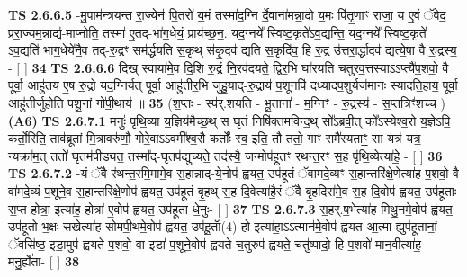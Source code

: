 \documentclass[17pt]{extarticle}
\begin{document}
                                \textbf{ TS 2.6.6.5} \newline
                  -मु॒पाम॑न्त्रयन्त रा॒ज्येन॑ पि॒तरो॑ य॒मं तस्मा॑द॒ग्नि र्दे॒वाना॑मन्ना॒दो य॒मः पि॑तृ॒णाꣳ राजा॒ य ए॒वं ॅवेद॒ प्ररा॒ज्यम॒न्नाद्य॑-माप्नोति॒ तस्मा॑ ए॒तद्-भा॑ग॒धेयं॒ प्राय॑च्छ॒न॒. यद॒ग्नये᳚ स्विष्ट॒कृते॑ऽव॒द्यन्ति॒ यद॒ग्नये᳚ स्विष्ट॒कृते॑ ऽव॒द्यति॑ भाग॒धेये॑नै॒व तद्-रु॒द्रꣳ सम॑र्द्धयति स॒कृथ् स॑कृ॒दव॑ द्यति स॒कृदि॑व॒ हि रु॒द्र उ॑त्तरा॒र्द्धादव॑ द्यत्ये॒षा वै रु॒द्रस्य॒ - [  ] \textbf{  34} \newline
                  \newline
                                \textbf{ TS 2.6.6.6} \newline
                  दिख् स्वाया॑मे॒व दि॒शि रु॒द्रं नि॒रव॑दयते॒ द्विर॒भि घा॑रयति चतुरव॒त्तस्याऽऽप्त्यै॑प॒शवो॒ वै पूर्वा॒ आहु॑तय ए॒ष रु॒द्रो यद॒ग्निर्यत् पूर्वा॒ आहु॑तीर॒भि जु॑हु॒याद्-रु॒द्राय॑ प॒शूनपि॑ दध्यादप॒शुर्यज॑मानः स्यादति॒हाय॒ पूर्वा॒ आहु॑तीर्जुहोति पशू॒नां गो॑पी॒थाय॑ ॥ \textbf{  35} \newline
                  \newline
                      (श॒प्तः - स्प॑र्.शयति - भू॒ताना॑ - म॒ग्निꣳ - रु॒द्रस्य॑ - स॒प्तत्रिꣳ॑शच्च )  \textbf{(A6)} \newline \newline
                                        \textbf{ TS 2.6.7.1} \newline
                  मनुः॑ पृथि॒व्या य॒ज्ञिय॑मैच्छ॒थ् स घृ॒तं निषि॑क्तमविन्द॒थ् सो᳚ऽब्रवी॒त् को᳚ऽस्येश्व॒रो य॒ज्ञेऽपि॒ कर्तो॒रिति॒ ताव॑ब्रूतां मि॒त्रावरु॑णौ॒ गोरे॒वाऽऽवमी᳚श्व॒रौ कर्तोः᳚ स्व॒ इति॒ तौ ततो॒ गाꣳ समै॑रयताꣳ॒॒ सा यत्र॑ यत्र॒ न्यक्रा॑म॒त् ततो॑ घृ॒तम॑पीड्यत॒ तस्मा᳚द्-घृ॒तप॑द्युच्यते॒ तद॑स्यै॒ जन्मोप॑हूतꣳ रथन्त॒रꣳ स॒ह पृ॑थि॒व्येत्या॑हे॒ - [  ] \textbf{  36} \newline
                  \newline
                                \textbf{ TS 2.6.7.2} \newline
                  -यं ॅवै र॑थन्त॒रमि॒मामे॒व स॒हान्नाद्-ये॒नोप॑ ह्वयत॒ उप॑हूतं ॅवामदे॒व्यꣳ स॒हान्तरि॑क्षे॒णेत्या॑ह प॒शवो॒ वै वा॑मदे॒व्यं प॒शूने॒व स॒हान्तरि॑क्षे॒णोप॑ ह्वयत॒ उप॑हूतं बृ॒हथ् स॒ह दि॒वेत्या॑है॒रं ॅवै बृ॒हदिरा॑मे॒व स॒ह दि॒वोप॑ ह्वयत॒ उप॑हूताः स॒प्त होत्रा॒ इत्या॑ह॒ होत्रा॑ ए॒वोप॑ ह्वयत॒ उप॑हूता धे॒नुः-  [  ] \textbf{  37} \newline
                  \newline
                                \textbf{ TS 2.6.7.3} \newline
                  स॒हर्.ष॒भेत्या॑ह मिथु॒नमे॒वोप॑ ह्वयत॒ उप॑हूतो भ॒क्षः सखेत्या॑ह सोमपी॒थमे॒वोप॑ ह्वयत॒ उप॑हू॒ताॅ(4) हो इत्या॑हा॒ऽऽत्मान॑मे॒वोप॑ ह्वयत आ॒त्मा ह्युप॑हूतानां॒ ॅवसि॑ष्ठ॒ इडा॒मुप॑ ह्वयते प॒शवो॒ वा इडा॑ प॒शूने॒वोप॑ ह्वयते च॒तुरुप॑ ह्वयते॒ चतु॑ष्पादो॒ हि प॒शवो॑ मान॒वीत्या॑ह॒ मनु॒र्ह्ये॑ता- [  ] \textbf{  38} \newline
\end{document}

